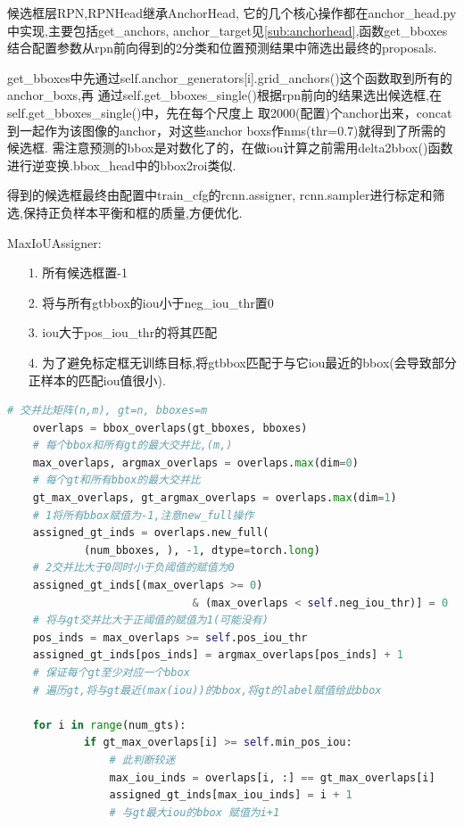 \documentclass[UTF8]{ctexart}
\begin{document}
候选框层RPN,RPNHead继承AnchorHead, 它的几个核心操作都在anchor\_head.py中实现,主要包括get\_anchors, 
anchor\_target见\ref{sub:anchorhead},函数get\_bboxes结合配置参数从rpn前向得到的2分类和位置预测结果中筛选出最终的proposals.

get\_bboxes中先通过self.anchor\_generators[i].grid\_anchors()这个函数取到所有的anchor\_boxs,再
通过self.get\_bboxes\_single()根据rpn前向的结果选出候选框,在self.get\_bboxes\_single()中，先在每个尺度上
取2000(配置)个anchor出来，concat到一起作为该图像的anchor，对这些anchor boxs作nms(thr=0.7)就得到了所需的候选框.
需注意预测的bbox是对数化了的，在做iou计算之前需用delta2bbox()函数进行逆变换.bbox\_head中的bbox2roi类似.

得到的候选框最终由配置中train\_cfg的rcnn.assigner, rcnn.sampler进行标定和筛选,保持正负样本平衡和框的质量,方便优化.

MaxIoUAssigner:
\label{sub:MaxIoUAssigner}
\begin{adjustwidth}{1cm}{0cm}
\begin{itemize}
	\item[1.] 所有候选框置-1
	\item[2.] 将与所有gtbbox的iou小于neg\_iou\_thr置0
	\item[3.] iou大于pos\_iou\_thr的将其匹配
	\item[4.] 为了避免标定框无训练目标,将gtbbox匹配于与它iou最近的bbox(会导致部分正样本的匹配iou值很小).
\end{itemize}
\end{adjustwidth}


\lstset{style=mystyle}
\begin{lstlisting}[language=Python]
	# 交并比矩阵(n,m), gt=n, bboxes=m
	overlaps = bbox_overlaps(gt_bboxes, bboxes)
	# 每个bbox和所有gt的最大交并比,(m,)
	max_overlaps, argmax_overlaps = overlaps.max(dim=0)
	# 每个gt和所有bbox的最大交并比
	gt_max_overlaps, gt_argmax_overlaps = overlaps.max(dim=1)
	# 1将所有bbox赋值为-1,注意new_full操作
	assigned_gt_inds = overlaps.new_full(
			(num_bboxes, ), -1, dtype=torch.long)
	# 2交并比大于0同时小于负阈值的赋值为0
	assigned_gt_inds[(max_overlaps >= 0)
							 & (max_overlaps < self.neg_iou_thr)] = 0
	# 将与gt交并比大于正阈值的赋值为1(可能没有)
	pos_inds = max_overlaps >= self.pos_iou_thr
	assigned_gt_inds[pos_inds] = argmax_overlaps[pos_inds] + 1
	# 保证每个gt至少对应一个bbox
	# 遍历gt,将与gt最近(max(iou))的bbox,将gt的label赋值给此bbox

	for i in range(num_gts):
			if gt_max_overlaps[i] >= self.min_pos_iou:
				# 此判断较迷
				max_iou_inds = overlaps[i, :] == gt_max_overlaps[i]
				assigned_gt_inds[max_iou_inds] = i + 1 
				# 与gt最大iou的bbox 赋值为i+1

\end{lstlisting}
\end{document}
